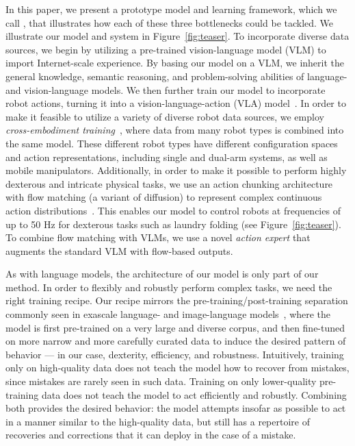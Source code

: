 In this paper, we present a prototype model and learning framework, which we call \ModelSymbol, that illustrates how each of these three bottlenecks could be tackled. We illustrate our model and system in Figure~\ref{fig:teaser}. To incorporate diverse data sources, we begin by utilizing a pre-trained vision-language model (VLM) to import Internet-scale experience. By basing our model on a VLM, we inherit the general knowledge, semantic reasoning, and problem-solving abilities of language- and vision-language models. 
We then further train our model to incorporate robot actions, turning it into a vision-language-action (VLA) model~\citep{brohan2023rt2visionlanguageactionmodelstransfer}. In order to make it feasible to utilize a variety of diverse robot data sources, we employ \emph{cross-embodiment training}~\citep{collaboration2023open}, where data from many robot types is combined into the same model. These different robot types have different configuration spaces and action representations, including single and dual-arm systems, as well as mobile manipulators. Additionally, in order to make it possible to perform highly dexterous and intricate physical tasks, we use an action chunking architecture~\citep{zhao2023learning} with flow matching (a variant of diffusion) to represent complex continuous action distributions~\citep{lipman2022flow, liu2022rectified}. This enables our model to control robots at frequencies of up to 50 Hz for dexterous tasks such as laundry folding (see Figure~\ref{fig:teaser}). To combine flow matching with VLMs, we use a novel \emph{action expert} that augments the standard VLM with flow-based outputs.

As with language models, the architecture of our model is only part of our method. In order to flexibly and robustly perform complex tasks, we need the right training recipe. Our recipe mirrors the pre-training/post-training separation commonly seen in exascale language- and image-language models~\citep{achiam2023gpt, team2023gemini}, where the model is first pre-trained on a very large and diverse corpus, and then fine-tuned on more narrow and more carefully curated data to induce the desired pattern of behavior --- in our case, dexterity, efficiency, and robustness. Intuitively, training only on high-quality data does not teach the model how to recover from mistakes, since mistakes are rarely seen in such data. Training on only lower-quality pre-training data does not teach the model to act efficiently and robustly. Combining both provides the desired behavior: the model attempts insofar as possible to act in a manner similar to the high-quality data, but still has a repertoire of recoveries and corrections that it can deploy in the case of a mistake.

